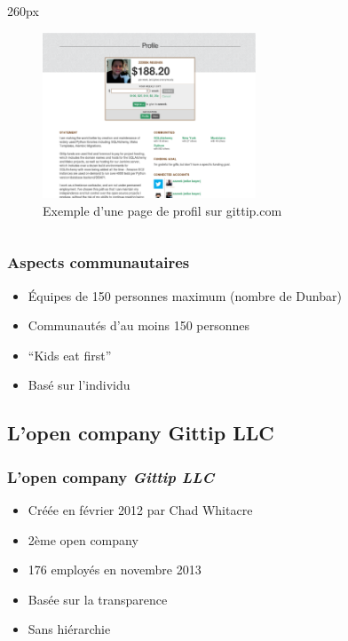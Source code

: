 {
\logo{}
\begin{frame}
\begin{center}
\begin{columns}
\begin{column}{260px}
{
    \begin{figure}[h!]
        \centering
        \includegraphics[width=240px]{images/section1/profilepage-gittip.eps}
        \caption{Exemple d'une page de profil sur gittip.com}
    \end{figure}
}
\end{column}
\end{columns}
\end{center}
\end{frame}
}


\begin{frame}
\frametitle{Aspects communautaires}

\begin{itemize}
    \itemsep1.5em
    \item Équipes de 150 personnes maximum (nombre de Dunbar)
    \item Communautés d'au moins 150 personnes
    \item ``Kids eat first''
    \item Basé sur l'individu
\end{itemize}
\end{frame}

    \subsection{L'open company Gittip LLC}


\begin{frame}
\frametitle{L'open company \emph{Gittip LLC}}

\begin{itemize}
    \itemsep1.5em
    \item Créée en février 2012 par Chad Whitacre
    \item 2ème open company
    \item 176 employés en novembre 2013
    \item Basée sur la transparence
    \item Sans hiérarchie
\end{itemize}
\end{frame}


